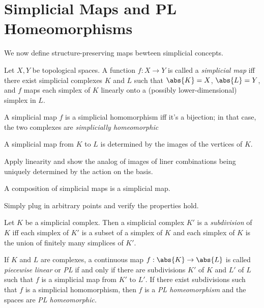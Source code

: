 \section{Simplicial Maps and PL Homeomorphisms}
We now define structure-preserving maps bewteen simplicial concepts.
\begin{definition}
  Let $X,Y$ be topological spaces. A function $f : X \to Y$ is called a
  \emph{simplicial map} iff there exist simplicial complexes $K$ and $L$ such
  that $\abs{K} = X$, $\abs{L} = Y$, and $f$ maps each simplex of $K$ linearly
  onto a (possibly lower-dimensional) simplex in $L$.
\end{definition}
\begin{definition}
  A simplicial map $f$ is a simplicial homomorphism iff it's a bijection; in
  that case, the two complexes are \emph{simplicially homeomorphic}
\end{definition}
\begin{problem}[15.17]
  A simplicial map from $K$ to $L$ is determined by the images of the vertices
  of $K$.
\end{problem}
\begin{solution}
  Apply linearity and show the analog of images of liner combinations being
  uniquely determined by the action on the basis.
\end{solution}
\begin{problem}[15.18]
  A composition of simplicial maps is a simplicial map.
\end{problem}
\begin{solution}
  Simply plug in arbitrary points and verify the properties hold.
\end{solution}
\begin{definition}[Subdivision]
  Let $K$ be a simplicial complex. Then a simplicial complex $K'$ is a
  \emph{subdivision} of $K$ iff each simplex of $K'$ is a subset of a simplex of
  $K$ and each simplex of $K$ is the union of finitely many simplices of $K'$.
\end{definition}
\begin{definition}
  If $K$ and $L$ are complexes, a continuous map $f : \abs{K} \to \abs{L}$ is
  called \emph{piecewise linear} or \emph{PL} if and only if there are
  subdivisions $K'$ of $K$ and $L'$ of $L$ such that $f$ is a simplicial map
  from $K'$ to $L'$. If there exist subdivisions such that $f$ is a simplicial
  homomorphism, then $f$ is a \emph{PL homeomorphism} and the spaces are
  \emph{PL homeomorphic.}
\end{definition}
